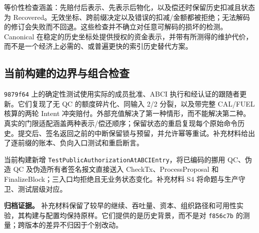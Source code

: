 等价性检查涵盖：先赔付后表示、先表示后物化，以及偿还时保留历史扣减且状态为 Recovered。无效坐标、跨前缀决定以及错误的扣减/金额都被拒绝；无法解码的修订会失败而不回退。这些检查并不确立对任意可解码的损坏的检测。Canonical 在稳定的历史坐标处提供授权的资金表示，并带有所测得的维护代价，而不是一个经济上必需的、或普遍更快的索引历史替代方案。



\subsection{当前构建的边界与组合检查}
\label{sec:eval-boundaries}
\texttt{9879f64} 上的确定性测试使用实际的成员批准、ABCI 执行和经认证的跟随者更新。它们复现了无 QC 的额度碎片化、同输入 2/2 分裂，以及带完整 CAL/FUEL 核算的两轮 Intent 冲突赔付。外部充值解决了第一种情形，而不能解决第二种。真实的门限适配涵盖两种表示/偿还顺序；保留状态的重启复现每个原始命令历史。提交后、签名返回之前的中断保留锁与预留，并允许幂等重试。补充材料给出了逐前缀的账本、负向入口测试和重启断言。

当前构建新增 \texttt{TestPublicAuthorization\allowbreak AtABCIEntry}，将已编码的挪用 QC、伪造 QC 及伪造所有者签名报文直接送入 CheckTx、ProcessProposal 和 FinalizeBlock；三入口均拒绝且无业务状态变化。补充材料 S4 将命题与生产守卫、测试层级对应。

\noindent\textbf{归档证据。}
补充材料保留了较早的继续、吞吐量、资本、组织路径和可用性实验，其构建与配置均保持原样。它们提供的是历史背景，而不是对 \texttt{f856c7b} 的测量；跨版本的差异不归因于个别改动。
